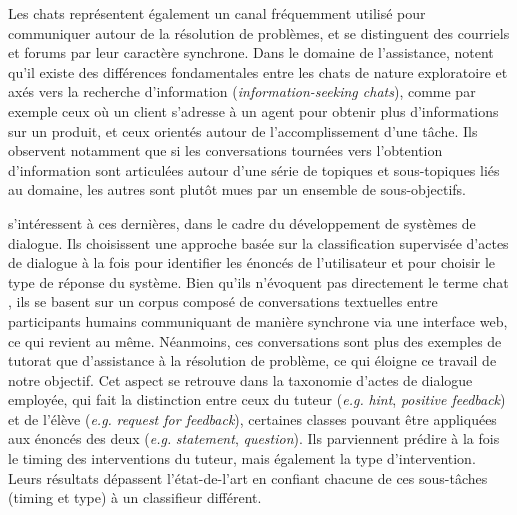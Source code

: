 \documentclass[10pt,a4paper,twoside]{article}
\begin{document}
Les chats représentent également un canal fréquemment utilisé pour communiquer autour de la résolution de problèmes, et se distinguent des courriels et forums par leur caractère synchrone. Dans le domaine de l'assistance, \citet{stede2004information} notent qu'il existe des différences fondamentales entre les chats de nature exploratoire et axés vers la recherche d'information (\textit{information-seeking chats}), comme par exemple ceux où un client s'adresse à un agent pour obtenir plus d'informations sur un produit, et ceux orientés autour de l'accomplissement d'une tâche. Ils observent notamment que si les conversations tournées vers l'obtention d'information sont articulées autour d'une série de topiques et sous-topiques liés au domaine, les autres sont plutôt mues par un ensemble de sous-objectifs.

\citet{ha2013learning} s'intéressent à ces dernières, dans le cadre du développement de systèmes de dialogue. Ils choisissent une approche basée sur la classification supervisée d'actes de dialogue à la fois pour identifier les énoncés de l'utilisateur et pour choisir le type de réponse du système. Bien qu'ils n'évoquent pas directement le terme \og chat \fg, ils se basent sur un corpus composé de conversations textuelles entre participants humains communiquant de manière synchrone via une interface web, ce qui revient au même. Néanmoins, ces conversations sont plus des exemples de tutorat que d'assistance à la résolution de problème, ce qui éloigne ce travail de notre objectif. Cet aspect se retrouve dans la taxonomie d'actes de dialogue employée, qui fait la distinction entre ceux du tuteur (\textit{e.g.} \textit{hint}, \textit{positive feedback}) et de l'élève (\textit{e.g.} \textit{request for feedback}), certaines classes pouvant être appliquées aux énoncés des deux (\textit{e.g.} \textit{statement}, \textit{question}). Ils parviennent prédire à la fois le timing des interventions du tuteur, mais également la type d'intervention. Leurs résultats dépassent l'état-de-l'art en confiant chacune de ces sous-tâches (timing et type) à un classifieur différent.
\end{document}
